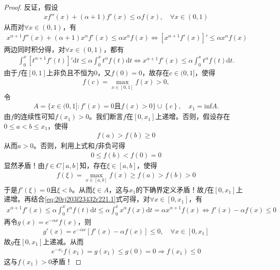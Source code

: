 \documentclass[../../main.tex]{subfiles}%
\begin{document}
\begin{proof}
反证，假设
\begin{align*}
xf''(x) + (\alpha + 1)f'(x) \leqslant \alpha f(x), \quad \forall x \in (0,1)
\end{align*}
从而对$\forall x \in (0,1)$，有
\begin{align*}
x^{\alpha + 1}f''(x) + (\alpha + 1)x^{\alpha}f'(x) \leqslant \alpha x^{\alpha}f(x) \Longleftrightarrow \left[ x^{\alpha + 1}f'(x) \right]' \leqslant \alpha x^{\alpha}f(x)
\end{align*}
两边同时积分得，对$\forall x \in (0,1)$，都有
\begin{align}
\int_0^x \left[ t^{\alpha + 1}f'(t) \right]' \mathrm{d}t \leqslant \alpha \int_0^x t^{\alpha}f(t) \mathrm{d}t \Longleftrightarrow x^{\alpha + 1}f'(x) \leqslant \alpha \int_0^x t^{\alpha}f(t) \mathrm{d}t .\label{eq:20rj203f23432r221.1}
\end{align}
由于$f$在$[0,1]$上非负且不恒为0，又$f(0) = 0$，故存在$c \in (0,1]$，使得
\begin{align*}
f(c) = \max_{x \in [0,1]} f(x) > 0,
\end{align*}
令
\begin{align*}
A=\{x\in (0,1]:f' (x)=0\text{且}f(x)>0\}\cup \left\{ c \right\} ,\quad x_1=\mathrm{inf}A.
\end{align*}
由$f$的连续性可知$f(x_1) > 0$。我们断言$f$在$[0,x_1]$上递增。否则，假设存在$0 \leqslant a < b \leqslant x_1$，使得
\begin{align*}
f(a) > f(b) \geqslant 0
\end{align*}
从而$a > 0$。否则，利用上式和$f$非负可得
\begin{align*}
0 \leqslant f(b) < f(0) = 0
\end{align*}
显然矛盾！由$f \in C[a,b]$知，存在$\xi \in [a,b]$，使得
\begin{align*}
f(\xi) = \max_{x \in [a,b]} f(x) \geqslant f(a) > f(b) > 0
\end{align*}
于是$f'(\xi) = 0$且$\xi < b$。从而$\xi \in A$，这与$x_1$的下确界定义矛盾！故$f$在$[0,x_1]$上递增。再结合\eqref{eq:20rj203f23432r221.1}式可得，对$\forall x \in [0,x_1]$，有
\begin{align*}
x^{\alpha + 1}f'(x) \leqslant \alpha \int_0^x t^{\alpha}f(t) \mathrm{d}t \leqslant \alpha \int_0^x x^{\alpha}f(x) \mathrm{d}t = \alpha x^{\alpha + 1}f(x) \Longleftrightarrow f'(x) - \alpha f(x) \leqslant 0
\end{align*}
再令$g(x) = e^{-\alpha x}f(x)$，则
\begin{align*}
g'(x) = e^{-\alpha x} \left[ f'(x) - \alpha f(x) \right] \leqslant 0, \quad \forall x \in [0,x_1]
\end{align*}
故$g$在$[0,x_1]$上递减。从而
\begin{align*}
e^{-x_1}f(x_1) = g(x_1) \leqslant g(0) = 0 \Longrightarrow f(x_1) \leqslant 0
\end{align*}
这与$f(x_1) > 0$矛盾！
\end{proof}
\end{document}

